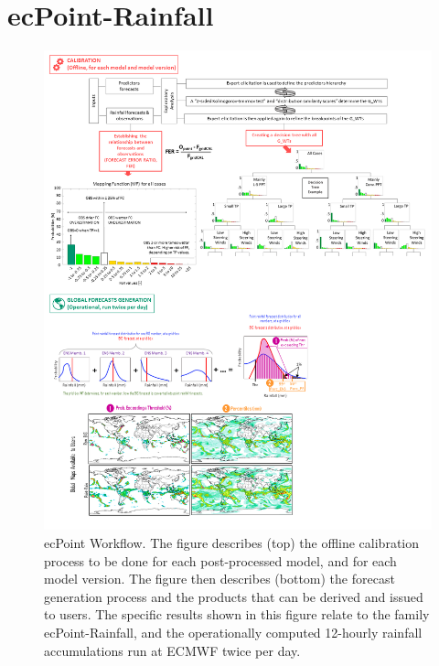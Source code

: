 \documentclass[twocol]{ametsocV5} %
\begin{document}

\section{ecPoint-Rainfall}

\begin{figure}
\centerline{\includegraphics[width=39pc]{manuscript/Figures/Fig1.png}}
\caption{ecPoint Workflow. The figure describes (top) the offline calibration process to be done for each post-processed model, and for each model version. The figure then describes (bottom) the forecast generation process and the products that can be derived and issued to users. The specific results shown in this figure relate to the family ecPoint-Rainfall, and the operationally computed 12-hourly rainfall accumulations run at ECMWF twice per day.}
\label{Fig.1}
\end{figure}
\end{document}
